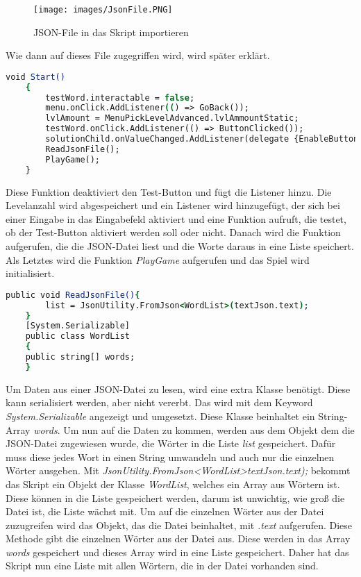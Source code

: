 \begin{figure}[htbp]
  \centering
  \texttt{[image: images/JsonFile.PNG]}
  \caption{JSON-File in das Skript importieren}
  \label{jsonUnity}
\end{figure}
Wie dann auf dieses File zugegriffen wird, wird später erklärt.\\
\begin{lstlisting}[language=csh, caption={WordMix.cs Start-Funktion}]
	void Start()
	{
		testWord.interactable = false;
		menu.onClick.AddListener(() => GoBack());
		lvlAmount = MenuPickLevelAdvanced.lvlAmmountStatic;
		testWord.onClick.AddListener(() => ButtonClicked());
		solutionChild.onValueChanged.AddListener(delegate {EnableButton(); });
		ReadJsonFile();
		PlayGame();
	}
\end{lstlisting}
Diese Funktion deaktiviert den Test-Button und fügt die Listener hinzu. Die Levelanzahl wird abgespeichert und ein Listener wird hinzugefügt, der sich bei einer Eingabe in das Eingabefeld aktiviert und eine Funktion aufruft, die testet, ob der Test-Button aktiviert werden soll oder nicht. Danach wird die Funktion aufgerufen, die die JSON-Datei liest und die Worte daraus in eine Liste speichert. Als Letztes wird die Funktion \textit{PlayGame} aufgerufen und das Spiel wird initialisiert.\\
\begin{lstlisting}[language=csh, caption={WordMix.cs ReadJsonFile-Funktion}]
	public void ReadJsonFile(){
		list = JsonUtility.FromJson<WordList>(textJson.text);
	}
	[System.Serializable]
	public class WordList
	{
	public string[] words;
	}
\end{lstlisting}
Um Daten aus einer JSON-Datei zu lesen, wird eine extra Klasse benötigt. Diese kann serialisiert werden, aber nicht vererbt. Das wird mit dem Keyword \textit{System.Serializable} angezeigt und umgesetzt. Diese Klasse beinhaltet ein String-Array \textit{words}. Um nun auf die Daten zu kommen, werden aus dem Objekt dem die JSON-Datei zugewiesen wurde, die Wörter in die Liste \textit{list} gespeichert. Dafür muss diese jedes Wort in einen String umwandeln und auch nur die einzelnen Wörter ausgeben. Mit \textit{JsonUtility.FromJson<WordList>textJson.text);} bekommt das Skript ein Objekt der Klasse \textit{WordList}, welches ein Array aus Wörtern ist. Diese können in die Liste gespeichert werden, darum ist unwichtig, wie groß die Datei ist, die Liste wächst mit. Um auf die einzelnen Wörter aus der Datei zuzugreifen wird das Objekt, das die Datei beinhaltet, mit \textit{.text} aufgerufen. Diese Methode gibt die einzelnen Wörter aus der Datei aus. Diese werden in das Array \textit{words} gespeichert und dieses Array wird in eine Liste gespeichert. Daher hat das Skript nun eine Liste mit allen Wörtern, die in der Datei vorhanden sind.\\
